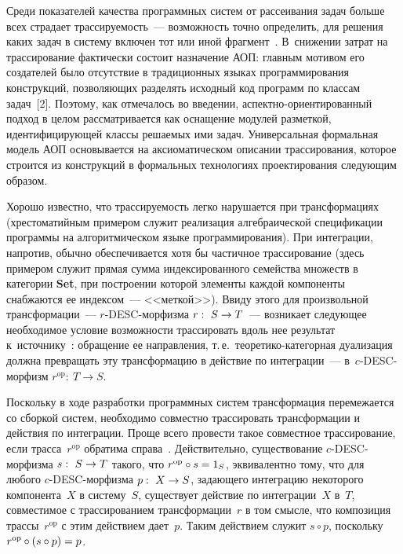 \begin{multicols}{2}
 Среди показателей качества программных сис\-тем от рассеивания задач
больше всех страдает трассируемость~--- возможность точно определить, для
решения каких задач в систему включен тот или иной фрагмент~\cite{13-kov}.
В~снижении затрат на трассирование фактически состоит назначение АОП:
главным мотивом его создателей было отсутствие в традиционных языках
программирования конструкций, позволяющих разделять исходный код
программ по классам задач~[2]. Поэтому, как отмечалось во введении,
ас\-пект\-но-ори\-ен\-ти\-ро\-ван\-ный подход в целом рассматривается как
оснащение модулей разметкой, идентифицирующей классы решаемых ими
задач. Универсальная формальная модель АОП основывается на
аксиоматическом описании трассирования, которое строится из конструкций в
формальных технологиях проектирования следующим образом.

 Хорошо известно, что трассируемость легко нарушается при
трансформациях (хрестоматийным примером служит реализация
алгебраической спецификации программы на алгоритмическом языке
программирования). При интеграции, напротив, обычно обеспечивается хотя
бы частичное трассирование (здесь примером служит прямая сумма
индексированного семейства множеств в категории \textbf{Set}, при
построении которой элементы каждой компоненты снабжаются ее индексом~---
<<меткой>>). Ввиду этого для произвольной трансформации~---
$r$-DESC-мор\-физ\-ма $r:\ S \hm\to T$~--- возникает сле\-ду\-ющее необходимое
условие возможности трассировать вдоль нее результат
к~источнику~\cite{12-kov}: \mbox{обращение} ее направления, т.\,е.\
тео\-ре\-ти\-ко-ка\-те\-гор\-ная дуализация должна превращать эту трансформацию в действие по
интеграции~--- в~$c$-DESC-мор\-физм $r^{\mathrm{op}}:\ T \to S$.

 Поскольку в ходе разработки программных сис\-тем трансформация
перемежается со сборкой сис\-тем, необходимо совместно трассировать
трансформации и действия по интеграции. Проще \mbox{всего} провести такое
совместное трассирование, если трасса~$r^{\mathrm{op}}$ обратима
справа~\cite{12-kov}. Действительно, существование $c$-DESC-мор\-физ\-ма
$s:\ S \hm\to T$ такого, что $r^{\mathrm{op}}\circ s \hm= 1_S$, эквивалентно тому,
что для любого $c$-DESC-мор\-физ\-ма $p:\ X \hm\to S$, задающего
интеграцию некоторого компонента~$X$ в систему~$S$, существует действие
по интеграции~$X$ в~$T$, со\-вмес\-ти\-мое с трассированием трансформации~$r$
в том смысле, что композиция трассы~$r^{\mathrm{op}}$ с этим действием
дает~$p$. Таким действием служит $s \circ p$, поскольку $r^{\mathrm{op}}\circ (s
\circ p) \hm= p$.


\end{multicols}
